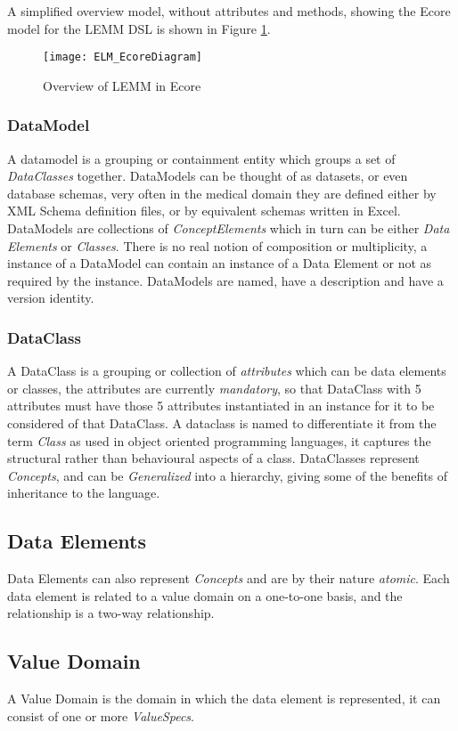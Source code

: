 A simplified overview model, without attributes and methods, showing the Ecore model for the LEMM DSL is shown in Figure \ref{fig:mcSimplifiedOverview}.

\begin{figure}[here]
	\texttt{[image: ELM\_EcoreDiagram]}
	\caption{Overview of LEMM in Ecore} 
	\label{fig:mcSimplifiedOverview}
\end{figure}

\subsubsection{DataModel}
A datamodel is a grouping or containment entity which groups a set of \emph{DataClasses} together. DataModels can be thought of as datasets, or even database schemas, very often in the medical domain they are defined either by XML Schema definition files, or by equivalent schemas written in Excel. 
DataModels are collections of \emph{ConceptElements} which in turn can be either \emph{Data Elements} or \emph{Classes}. There is no real notion of composition or multiplicity, a instance of a DataModel can contain an instance of a Data Element or not as required by the instance.  DataModels are named, have a description and have a version identity.
\subsubsection{DataClass}
A DataClass is a grouping or collection of \emph{attributes} which can be data elements or classes, the attributes are currently \emph{mandatory}, so that DataClass with 5 attributes must have those 5 attributes instantiated in an instance for it to be considered of that DataClass. A dataclass is named to differentiate it from the term \emph{Class} as used in object oriented programming languages, it captures the structural rather than behavioural aspects of a class.  DataClasses represent \emph{Concepts}, and can be \emph{Generalized} into a hierarchy, giving some of the benefits of inheritance to the language.  
\subsection{Data Elements} 
Data Elements can also represent \emph{Concepts} and are by their nature \emph{atomic}.  Each data element is related to a value domain on a one-to-one basis, and the relationship is a two-way relationship.
\subsection{Value Domain}
A Value Domain is the domain in which the data element is represented, it can consist of one or more \emph{ValueSpecs}.
